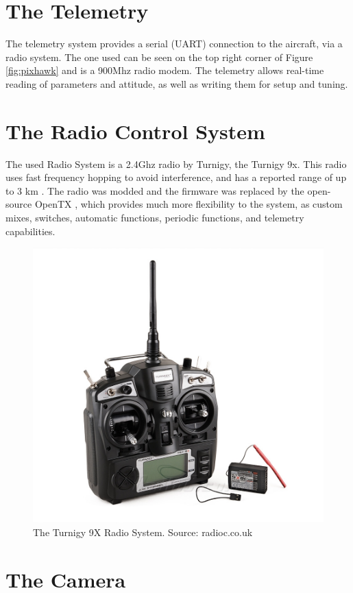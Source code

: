 \section{The Telemetry}

The telemetry system provides a serial (UART) connection to the aircraft, via a radio system.
%
The one used can be seen on the top right corner of Figure \ref{fig:pixhawk} and is a 900Mhz radio modem.
%
The telemetry allows real-time reading of parameters and attitude, as well as writing them for setup and tuning.

\section{The Radio Control System}

The used Radio System is a 2.4Ghz radio by Turnigy, the Turnigy 9x.
%
This radio uses fast frequency hopping to avoid interference, and has a reported range of up to 3 km \cite{range9x}.
%
The radio was modded\cite{t9xmod} and the firmware was replaced by the open-source OpenTX \cite{opentx}, which provides much more flexibility to the system, as custom mixes, switches, automatic functions, periodic functions, and telemetry capabilities.

\begin{figure}[H]
\centering
  \includegraphics[width=0.8\linewidth]{figs/t9x.jpg}
  \caption{The Turnigy 9X Radio System. Source: radioc.co.uk}
  \label{fig:t9x}
\end{figure}


\section{The Camera}

